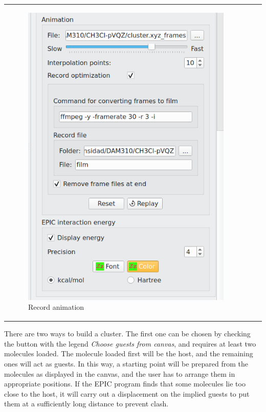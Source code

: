 \documentclass[10pt]{article}
\begin{document}
\begin{tabular}{lcr}
\begin{minipage}{.3\linewidth}
\begin{figure}[H]
    \begin{center}
        \vspace*{-4mm}
        \includegraphics[width=0.77\linewidth]{damqt320_mespimizer_3.png}
    \end{center}
    \vspace*{17mm}
    \caption{Record animation\label{fig:4_10_3}}
\end{figure}
\end{minipage}
\end{tabular}

\vspace*{5mm}

There are two ways to build a cluster. The first one can be chosen by 
checking the button with the legend {\it  Choose guests from canvas}, and
requires at least two molecules loaded. The molecule loaded 
first will be the host, and the remaining ones will act as guests.
In this way, a starting point will be prepared from the molecules as 
displayed in the canvas, and the user has to arrange them in appropriate 
positions. If the EPIC program finds that some molecules lie too close
to the host, 
it will carry out a displacement on the implied guests to put them at a 
sufficiently long distance to prevent clash.
\end{document}
